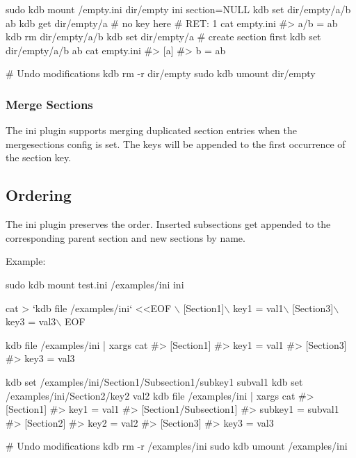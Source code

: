 \begin{DoxyCode}
sudo kdb mount /empty.ini dir/empty ini section=NULL
kdb set dir/empty/a/b ab
kdb get dir/empty/a       # no key here
# RET: 1
cat empty.ini
#> a/b = ab
kdb rm dir/empty/a/b
kdb set dir/empty/a    # create section first
kdb set dir/empty/a/b ab
cat empty.ini
#> [a]
#> b = ab

# Undo modifications
kdb rm -r dir/empty
sudo kdb umount dir/empty
\end{DoxyCode}


\subsubsection*{Merge Sections}

The ini plugin supports merging duplicated section entries when the {\ttfamily mergesections} config is set. The keys will be appended to the first occurrence of the section key.

\subsection*{Ordering}

The ini plugin preserves the order. Inserted subsections get appended to the corresponding parent section and new sections by name.

Example\+:


\begin{DoxyCode}
sudo kdb mount test.ini /examples/ini ini

cat > `kdb file /examples/ini` <<EOF \(\backslash\)
[Section1]\(\backslash\)
key1 = val1\(\backslash\)
[Section3]\(\backslash\)
key3 = val3\(\backslash\)
EOF

kdb file /examples/ini | xargs cat
#> [Section1]
#> key1 = val1
#> [Section3]
#> key3 = val3

kdb set /examples/ini/Section1/Subsection1/subkey1 subval1
kdb set /examples/ini/Section2/key2 val2
kdb file /examples/ini | xargs cat
#> [Section1]
#> key1 = val1
#> [Section1/Subsection1]
#> subkey1 = subval1
#> [Section2]
#> key2 = val2
#> [Section3]
#> key3 = val3

# Undo modifications
kdb rm -r /examples/ini
sudo kdb umount /examples/ini
\end{DoxyCode}
 